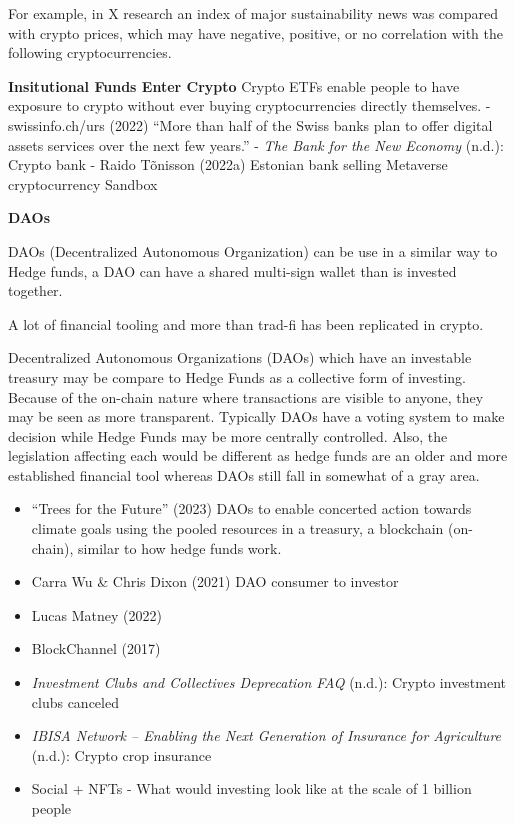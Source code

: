 \documentclass[
  letterpaper,
  DIV=11,
  numbers=noendperiod]{scrartcl}
\begin{document}
For example, in X research an index of major sustainability news was
compared with crypto prices, which may have negative, positive, or no
correlation with the following cryptocurrencies.

\textbf{Insitutional Funds Enter Crypto} Crypto ETFs enable people to
have exposure to crypto without ever buying cryptocurrencies directly
themselves. - swissinfo.ch/urs (2022) ``More than half of the Swiss
banks plan to offer digital assets services over the next few years.'' -
\emph{The {Bank} for the {New Economy}} (n.d.): Crypto bank - Raido
Tõnisson (2022a) Estonian bank selling Metaverse cryptocurrency Sandbox

\textbf{DAOs}

DAOs (Decentralized Autonomous Organization) can be use in a similar way
to Hedge funds, a DAO can have a shared multi-sign wallet than is
invested together.

A lot of financial tooling and more than trad-fi has been replicated in
crypto.

Decentralized Autonomous Organizations (DAOs) which have an investable
treasury may be compare to Hedge Funds as a collective form of
investing. Because of the on-chain nature where transactions are visible
to anyone, they may be seen as more transparent. Typically DAOs have a
voting system to make decision while Hedge Funds may be more centrally
controlled. Also, the legislation affecting each would be different as
hedge funds are an older and more established financial tool whereas
DAOs still fall in somewhat of a gray area.

\begin{itemize}
\item
  {``Trees for the {Future}''} (2023) DAOs to enable concerted action
  towards climate goals using the pooled resources in a treasury, a
  blockchain (on-chain), similar to how hedge funds work.
\item
  Carra Wu \& Chris Dixon (2021) DAO consumer to investor
\item
  Lucas Matney (2022)
\item
  BlockChannel (2017)
\item
  \emph{Investment {Clubs} and {Collectives} {\textbar} {Deprecation
  FAQ}} (n.d.): Crypto investment clubs canceled
\item
  \emph{{IBISA Network} -- {Enabling} the {Next Generation} of
  {Insurance} for {Agriculture}} (n.d.): Crypto crop insurance
\item
  Social + NFTs - What would investing look like at the scale of 1
  billion people
\end{itemize}
\end{document}
